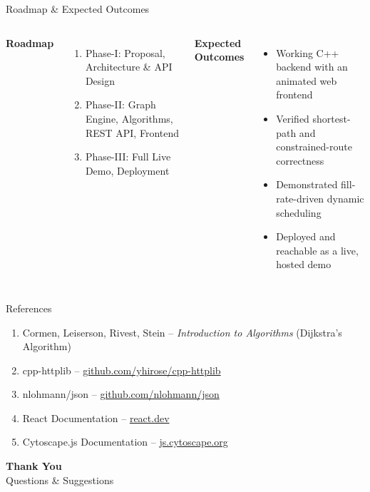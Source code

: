 \documentclass[aspectratio=169,11pt]{beamer}
\begin{document}
\begin{frame}{Roadmap \& Expected Outcomes}
\begin{columns}[T,totalwidth=\textwidth]
\textbf{\color{GEUBlue}Roadmap}
\begin{enumerate}\itemsep6pt
\item Phase-I: Proposal, Architecture \& API Design
\item Phase-II: Graph Engine, Algorithms, REST API, Frontend
\item Phase-III: Full Live Demo, Deployment
\end{enumerate}
\textbf{\color{GEUBlue}Expected Outcomes}
\begin{itemize}\itemsep3pt
\item Working C++ backend with an animated web frontend
\item Verified shortest-path and constrained-route correctness
\item Demonstrated fill-rate-driven dynamic scheduling
\item Deployed and reachable as a live, hosted demo
\end{itemize}
\end{columns}
\end{frame}

\begin{frame}{References}
\begin{enumerate}\itemsep7pt
\item Cormen, Leiserson, Rivest, Stein -- \textit{Introduction to Algorithms} (Dijkstra's Algorithm)
\item cpp-httplib -- \url{github.com/yhirose/cpp-httplib}
\item nlohmann/json -- \url{github.com/nlohmann/json}
\item React Documentation -- \url{react.dev}
\item Cytoscape.js Documentation -- \url{js.cytoscape.org}
\end{enumerate}
\vfill
\begin{center}
\colorbox{GEUBlue}{\parbox{.78\textwidth}{\centering\color{white}\Large\textbf{Thank You}\\\normalsize Questions \& Suggestions}}
\end{center}
\end{frame}
\end{document}
